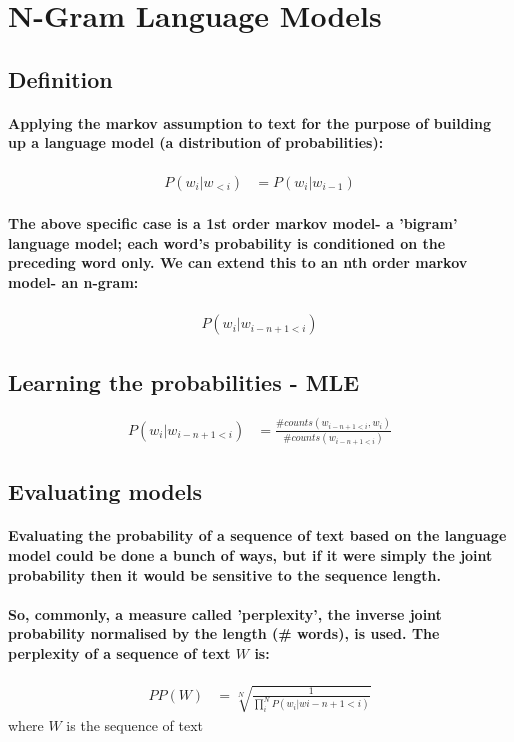 \documentclass{article}
\begin{document}
\section{N-Gram Language Models}
\subsection{Definition}
\paragraph{Applying the markov assumption to text for the purpose of building up a language model (a distribution of probabilities):}
\begin{align}
	P(w_i | w_{<i}) &= P(w_i|w_{i-1})
\end{align}
\paragraph{The above specific case is a 1st order markov model- a 'bigram' language model; each word's probability is conditioned on the preceding word only. We can extend this to an nth order markov model- an n-gram:}
\begin{align}
	P(w_i|w_{i-n+1 < i})
\end{align}
\subsection{Learning the probabilities - MLE}
\begin{align}
	P(w_i|w_{i-n+1 < i}) &= \frac{\# counts(w_{i-n+1 < i}, w_i)}{\# counts(w_{i-n+1 <i})}
\end{align}
\subsection{Evaluating models}
\paragraph{Evaluating the probability of a sequence of text based on the language model could be done a bunch of ways, but if it were simply the joint probability then it would be sensitive to the sequence length.}
\paragraph{So, commonly, a measure called 'perplexity', the inverse joint probability normalised by the length (\# words), is used. The perplexity of a sequence of text $W$ is:}
\begin{align}
	PP(W) &= \sqrt[N]{\frac{1}{\prod_i^N P(w_i|w{i-n+1}<i)}} 
\end{align}
where $W$ is the sequence of text
\newpage
\end{document}
